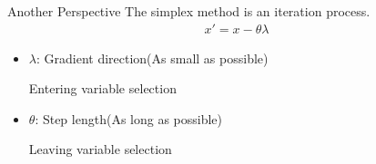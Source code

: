     \begin{frame}{Another Perspective}
      The simplex method is an iteration process.
      \begin{equation*}
        \begin{align}
        x' = x - \theta\lambda
        \end{align}
      \end{equation*}
      \begin{itemize}
        \item $\lambda $: Gradient direction(As small as possible)

        Entering variable selection

        \item $\theta $: Step length(As long as possible)

        Leaving variable selection
      \end{itemize}
    \end{frame}
